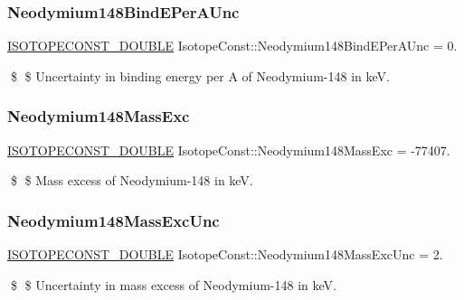 \subsubsection{\texorpdfstring{Neodymium148\+Bind\+E\+Per\+A\+Unc}{Neodymium148BindEPerAUnc}}
{\footnotesize\ttfamily \mbox{\hyperlink{group___isotope_const-_macros_ga8f45a7272ce02c0b4c65c44636ed719a}{I\+S\+O\+T\+O\+P\+E\+C\+O\+N\+S\+T\+\_\+\+D\+O\+U\+B\+LE}} Isotope\+Const\+::\+Neodymium148\+Bind\+E\+Per\+A\+Unc = 0.}

\$ \$ Uncertainty in binding energy per A of Neodymium-\/148 in keV. \mbox{\label{group___isotope_const-_neodymium-_nd148_ga5c9dae49e04595b390e6eb4a79f4a880}} 
\subsubsection{\texorpdfstring{Neodymium148\+Mass\+Exc}{Neodymium148MassExc}}
{\footnotesize\ttfamily \mbox{\hyperlink{group___isotope_const-_macros_ga8f45a7272ce02c0b4c65c44636ed719a}{I\+S\+O\+T\+O\+P\+E\+C\+O\+N\+S\+T\+\_\+\+D\+O\+U\+B\+LE}} Isotope\+Const\+::\+Neodymium148\+Mass\+Exc = -\/77407.}

\$ \$ Mass excess of Neodymium-\/148 in keV. \mbox{\label{group___isotope_const-_neodymium-_nd148_ga1fc357a80582fb44183d4d41d09c78c9}} 
\subsubsection{\texorpdfstring{Neodymium148\+Mass\+Exc\+Unc}{Neodymium148MassExcUnc}}
{\footnotesize\ttfamily \mbox{\hyperlink{group___isotope_const-_macros_ga8f45a7272ce02c0b4c65c44636ed719a}{I\+S\+O\+T\+O\+P\+E\+C\+O\+N\+S\+T\+\_\+\+D\+O\+U\+B\+LE}} Isotope\+Const\+::\+Neodymium148\+Mass\+Exc\+Unc = 2.}

\$ \$ Uncertainty in mass excess of Neodymium-\/148 in keV. \mbox{\label{group___isotope_const-_neodymium-_nd148_ga574db860490ad944e386cb2234237913}} 
